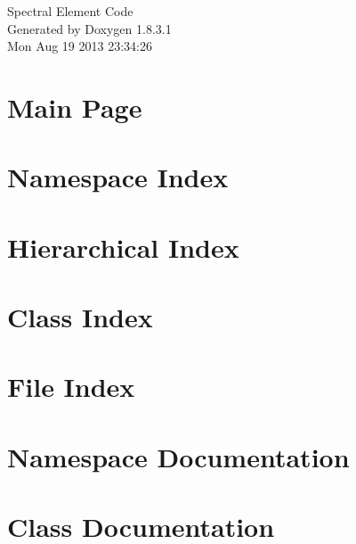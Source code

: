 \documentclass{book}
\begin{document}
\hypersetup{pageanchor=false,citecolor=blue}
\begin{titlepage}
\vspace*{7cm}
\begin{center}
{\Large Spectral Element Code }\\
\vspace*{1cm}
{\large Generated by Doxygen 1.8.3.1}\\
\vspace*{0.5cm}
{\small Mon Aug 19 2013 23:34:26}\\
\end{center}
\end{titlepage}
\clearemptydoublepage
{}
\tableofcontents
\clearemptydoublepage
{}
\hypersetup{pageanchor=true,citecolor=blue}
\chapter{Main Page}
\label{index}\hypertarget{index}{}
\chapter{Namespace Index}

\chapter{Hierarchical Index}

\chapter{Class Index}

\chapter{File Index}

\chapter{Namespace Documentation}






\chapter{Class Documentation}



























\end{document}
